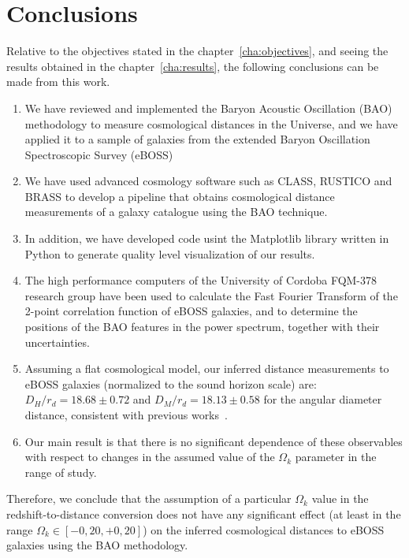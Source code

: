 \chapter*{Conclusions}

Relative to the objectives stated in the chapter~\ref{cha:objectives}, and seeing the results obtained in the chapter~\ref{cha:results}, the following conclusions can be made from this work.

\begin{enumerate}
	\item We have reviewed and implemented the Baryon Acoustic Oscillation (BAO) methodology to measure cosmological distances in the Universe, and we have applied it to a sample of galaxies from the extended Baryon Oscillation Spectroscopic Survey (eBOSS)
	\item We have used advanced cosmology software such as CLASS, RUSTICO and BRASS to develop a pipeline that obtains cosmological distance measurements of a galaxy catalogue using the BAO technique.
	\item In addition, we have developed code usint the Matplotlib library written in Python to generate quality level visualization of our results.
	\item The high performance computers of the University of Cordoba FQM-378 research group have been used to calculate the Fast Fourier Transform of the 2-point correlation function of eBOSS galaxies, and to determine the positions of the BAO features in the power spectrum, together with their uncertainties.
	\item Assuming a flat cosmological model, our inferred distance measurements to eBOSS galaxies (normalized to the sound horizon scale) are: $D_H/r_d = 18.68 \pm 0.72$ and $D_M/r_d = 18.13 \pm 0.58$ for the angular diameter distance, consistent with previous works~\cite{hector}.
	\item Our main result is that there is no significant dependence of these observables with respect to changes in the assumed value of the $\Omega_k$ parameter in the range of study.
\end{enumerate}

Therefore, we conclude that the assumption of a particular $\Omega_k$ value in the redshift-to-distance conversion does not have any significant effect (at least in the range $\Omega_k \in [-0,20, +0,20]$) on the inferred cosmological distances to eBOSS galaxies using the BAO methodology.

